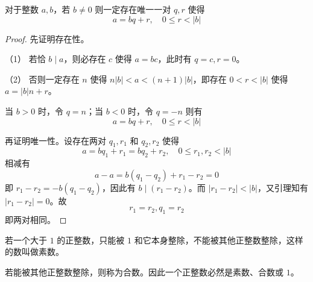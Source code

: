 \begin{theorem}
	对于整数 $a,b$，若 $b\ne 0$ 则一定存在唯一一对 $q,r$ 使得
	$$a=bq+r,\quad 0 \leqslant r< |b|$$
\end{theorem}

\begin{proof}
	先证明存在性。
	
	（1） 若恰 $b \mid a$，则必存在 $c$ 使得 $a=bc$，此时有 $q=c,r=0$。

	（2） 否则一定存在 $n$ 使得 $n|b|<a<(n+1)|b|$，即存在 $0<r<|b|$ 使得 $a=|b|n+r$。
	
	当 $b>0$ 时，令 $q=n$；当 $b<0$ 时，令 $q=-n$ 则有
	$$a=bq+r,\quad 0 \leqslant r< |b|$$

	再证明唯一性。设存在两对 $q_1,r_1$ 和 $q_2,r_2$ 使得
	$$a=bq_1+r_1=bq_2+r_2,\quad 0 \leqslant r_1,r_2< |b|$$
	相减有
	$$a-a=b(q_1-q_2)+r_1-r_2=0$$
	即 $r_1-r_2=-b(q_1-q_2)$，因此有 $b \mid (r_1-r_2)$。而 $|r_1-r_2|<|b|$，又引理知有 $|r_1-r_2|=0$。故
	$$r_1=r_2,q_1=r_2$$
	即两对相同。
\end{proof}

\begin{definition}[素数]
	若一个大于 $1$ 的正整数，只能被 $1$ 和它本身整除，不能被其他正整数整除，这样的数叫做素数。
\end{definition}

若能被其他正整数整除，则称为合数。因此一个正整数必然是素数、合数或 $1$。
